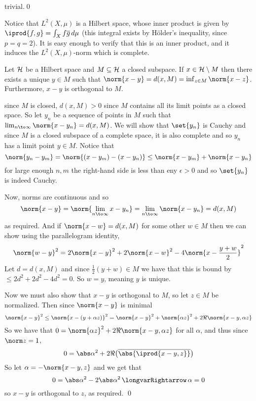 \eprop

\Proof trivial.\qed

Notice that $L^2(X,\mu)$ is a Hilbert space, whose inner product is given by $\iprod{f,g}=\int_X f\overline g\,d\mu$ (this integral exists by H\"older's inequality, since $p=q=2$).
It is easy enough to verify that this is an inner product, and it induces the $L^2(X,\mu)$-norm which is complete.

\bthrm

    Let ${\cal H}$ be a Hilbert space and $M\subseteq{\cal H}$ a closed subspace.
    If $x\in{\cal H}\setminus M$ then there exists a unique $y\in M$ such that $\norm{x-y}=d(x,M)=\inf_{z\in M}\norm{x-z}$.
    Furthermore, $x-y$ is orthogonal to $M$.

\ethrm

\Proof since $M$ is closed, $d(x,M)>0$ since $M$ contains all its limit points as a closed space.
So let $y_n$ be a sequence of points in $M$ such that $\lim_{n\to\infty}\norm{x-y_n}=d(x,M)$.
We will show that $\set{y_n}$ is Cauchy and since $M$ is a closed subspace of a complete space, it is also complete and so $y_n$ has a limit point $y\in M$.
Notice that
$$ \norm{y_n-y_m} = \norm{(x-y_m) - (x-y_n)} \leq \norm{x-y_m} + \norm{x-y_n} $$
for large enough $n,m$ the right-hand side is less than eny $\epsilon>0$ and so $\set{y_n}$ is indeed Cauchy.

Now, norms are continuous and so
$$ \norm{x-y} = \norm{\lim_{n\to\infty}x-y_n} = \lim_{n\to\infty}\norm{x-y_n} = d(x,M) $$
as required.
And if $\norm{x-w}=d(x,M)$ for some other $w\in M$ then we can show using the parallelogram identity,
$$ \norm{w-y}^2 = 2\norm{x-y}^2 + 2\norm{x-w}^2 - 4\norm{x-\frac{y+w}2}^2 $$
Let $d=d(x,M)$ and since $\frac12(y+w)\in M$ we have that this is bound by $\leq2d^2+2d^2-4d^2=0$.
So $w=y$, meaning $y$ is unique.

Now we must also show that $x-y$ is orthogonal to $M$, so let $z\in M$ be normalized.
Then since $\norm{x-y}$ is minimal
$$ \norm{x-y}^2 \leq \norm{x-(y+\alpha z)}^2 = \norm{x-y}^2 + \norm{\alpha z}^2 + 2\Re\norm{x-y,\alpha z} $$
So we have that $0=\norm{\alpha z}^2 + 2\Re\norm{x-y,\alpha z}$ for all $\alpha$, and thus since $\norm z=1$,
$$ 0=\abs\alpha^2 + 2\Re\bigl(\overline{\abs{\iprod{x-y,z}}}\bigr) $$
So let $\alpha=-\norm{x-y,z}$ and we get that
$$ 0 = \abs\alpha^2 - 2\abs\alpha^2 \implies \alpha = 0 $$
so $x-y$ is orthogonal to $z$, as required.
\qed

\bprop[title=Bessel's Inequality, name=besselineq]

